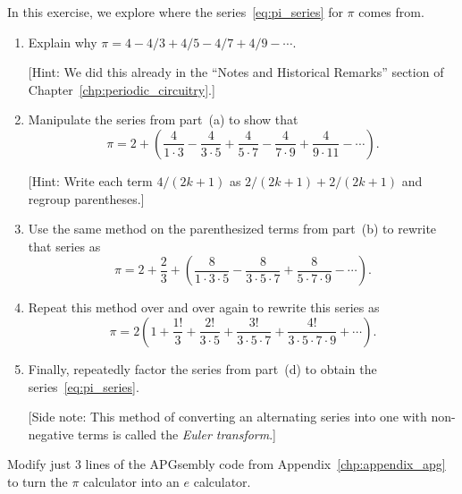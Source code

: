 \begin{multicols}{2}
	
	\mfilbreak
	
	
	\begin{problemstar}\label{exer:universal_computation_derive_pi_series}
		In this exercise, we explore where the series~\eqref{eq:pi_series} for $\pi$ comes from.\smallskip
		
		\begin{enumerate}[label=\bf\color{ocre}(\alph*)]
			\item Explain why $\pi = 4 - 4/3 + 4/5 - 4/7 + 4/9 - \cdots$.
			
			[Hint: We did this already in the ``Notes and Historical Remarks'' section of Chapter~\ref{chp:periodic_circuitry}.]
			
			\item Manipulate the series from part~(a) to show that
			\[
			\pi = 2 + \left(\frac{4}{1\cdot 3} - \frac{4}{3\cdot 5} + \frac{4}{5\cdot 7} - \frac{4}{7\cdot 9} + \frac{4}{9\cdot 11} - \cdots\right).
			\]
			
			[Hint: Write each term $4/(2k+1)$ as $2/(2k+1) + 2/(2k+1)$ and regroup parentheses.]
			
			\item Use the same method on the parenthesized terms from part~(b) to rewrite that series as
			\[
			\pi = 2 + \frac{2}{3} + \left(\frac{8}{1\cdot 3 \cdot 5} - \frac{8}{3\cdot 5 \cdot 7} + \frac{8}{5\cdot 7 \cdot 9} - \cdots\right).
			\]
			
			\item Repeat this method over and over again to rewrite this series as
			\[
			\pi = 2\left(1 + \frac{1!}{3} + \frac{2!}{3\cdot 5} + \frac{3!}{3\cdot 5 \cdot 7} + \frac{4!}{3 \cdot 5 \cdot 7 \cdot 9} + \cdots\right).
			\]
			
			\item Finally, repeatedly factor the series from part~(d) to obtain the series~\eqref{eq:pi_series}.
			
			[Side note: This method of converting an alternating series into one with non-negative terms is called the \emph{Euler transform}.]
		\end{enumerate}
	\end{problemstar}
	
	
	\mfilbreak
	
	
	\begin{problemstar}\label{exer:universal_computation_e_calc}
		Modify just $3$ lines of the APGsembly code from Appendix~\ref{chp:appendix_apg} to turn the $\pi$ calculator into an $e$ calculator.
		

\end{problemstar}
\end{multicols}
